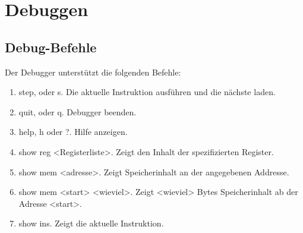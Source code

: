 \section{Debuggen}

\subsection{Debug-Befehle}

Der Debugger unterstützt die folgenden Befehle:

\begin{enumerate}
 \item step, oder s. Die aktuelle Instruktion ausführen und die nächste laden.
 \item quit, oder q. Debugger beenden.
 \item help, h oder ?. Hilfe anzeigen.
 \item show reg <Registerliste>. Zeigt den Inhalt der spezifizierten Register.
 \item show mem <adresse>. Zeigt Speicherinhalt an der angegebenen Addresse.
 \item show mem <start> <wieviel>. Zeigt <wieviel> Bytes Speicherinhalt ab
       der Adresse <start>.
 \item show ins. Zeigt die aktuelle Instruktion.
\end{enumerate}

